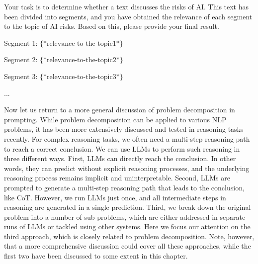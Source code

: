 \vspace{0.5em}
\begin{tcolorbox}

\begingroup
\setlength{\leftskip}{2em}
\setlength{\rightskip}{2em}

Your task is to determine whether a text discusses the risks of AI. This text has been divided into segments, and you have obtained the relevance of each segment to the topic of AI risks. Based on this, please provide your final result.

\vspace{0.5em}

Segment 1: $\{*\mathrm{relevance\textrm{-}to\textrm{-}the\textrm{-}topic1}*\}$

\vspace{0.3em}

Segment 2: $\{*\mathrm{relevance\textrm{-}to\textrm{-}the\textrm{-}topic2}*\}$

\vspace{0.3em}

Segment 3: $\{*\mathrm{relevance\textrm{-}to\textrm{-}the\textrm{-}topic3}*\}$

\vspace{0.3em}

...

\vspace{0.5em}

\underline{\hspace{2em}}

\endgroup

\end{tcolorbox}
\vspace{0.5em}

Now let us return to a more general discussion of problem decomposition in prompting. While problem decomposition can be applied to various NLP problems, it has been more extensively discussed and tested in reasoning tasks recently. For complex reasoning tasks, we often need a multi-step reasoning path to reach a correct conclusion. We can use LLMs to perform such reasoning in three different ways. First, LLMs can directly reach the conclusion. In other words, they can predict without explicit reasoning processes, and the underlying reasoning process remains implicit and uninterpretable. Second, LLMs are prompted to generate a multi-step reasoning path that leads to the conclusion, like CoT. However, we run LLMs just once, and all intermediate steps in reasoning are generated in a single prediction. Third, we break down the original problem into a number of sub-problems, which are either addressed in separate runs of LLMs or tackled using other systems. Here we focus our attention on the third approach, which is closely related to problem decomposition. Note, however, that a more comprehensive discussion could cover all these approaches, while the first two have been discussed to some extent in this chapter.

